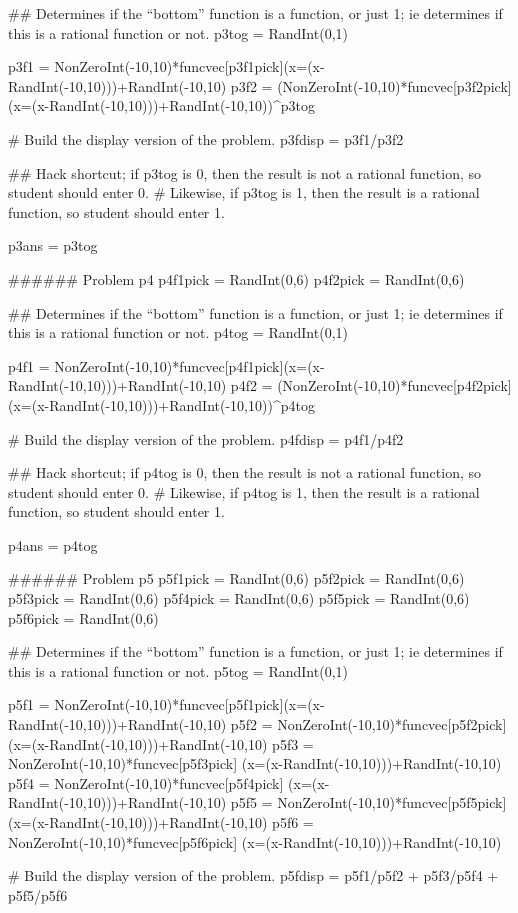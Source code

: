 \documentclass{ximera}
\begin{document}
\begin{sagesilent}
## Determines if the ``bottom'' function is a function, or just 1; ie determines if this is a rational function or not.
p3tog = RandInt(0,1)

p3f1 = NonZeroInt(-10,10)*funcvec[p3f1pick](x=(x-RandInt(-10,10)))+RandInt(-10,10)
p3f2 = (NonZeroInt(-10,10)*funcvec[p3f2pick](x=(x-RandInt(-10,10)))+RandInt(-10,10))^p3tog

# Build the display version of the problem.
p3fdisp = p3f1/p3f2

## Hack shortcut; if p3tog is 0, then the result is not a rational function, so student should enter 0.
#   Likewise, if p3tog is 1, then the result is a rational function, so student should enter 1.

p3ans = p3tog


###### Problem p4
p4f1pick = RandInt(0,6)
p4f2pick = RandInt(0,6)

## Determines if the ``bottom'' function is a function, or just 1; ie determines if this is a rational function or not.
p4tog = RandInt(0,1)

p4f1 = NonZeroInt(-10,10)*funcvec[p4f1pick](x=(x-RandInt(-10,10)))+RandInt(-10,10)
p4f2 = (NonZeroInt(-10,10)*funcvec[p4f2pick](x=(x-RandInt(-10,10)))+RandInt(-10,10))^p4tog

# Build the display version of the problem.
p4fdisp = p4f1/p4f2

## Hack shortcut; if p4tog is 0, then the result is not a rational function, so student should enter 0.
#   Likewise, if p4tog is 1, then the result is a rational function, so student should enter 1.

p4ans = p4tog



###### Problem p5
p5f1pick = RandInt(0,6)
p5f2pick = RandInt(0,6)
p5f3pick = RandInt(0,6)
p5f4pick = RandInt(0,6)
p5f5pick = RandInt(0,6)
p5f6pick = RandInt(0,6)

## Determines if the ``bottom'' function is a function, or just 1; ie determines if this is a rational function or not.
p5tog = RandInt(0,1)

p5f1 = NonZeroInt(-10,10)*funcvec[p5f1pick](x=(x-RandInt(-10,10)))+RandInt(-10,10)
p5f2 = NonZeroInt(-10,10)*funcvec[p5f2pick] (x=(x-RandInt(-10,10)))+RandInt(-10,10)
p5f3 = NonZeroInt(-10,10)*funcvec[p5f3pick] (x=(x-RandInt(-10,10)))+RandInt(-10,10)
p5f4 = NonZeroInt(-10,10)*funcvec[p5f4pick] (x=(x-RandInt(-10,10)))+RandInt(-10,10)
p5f5 = NonZeroInt(-10,10)*funcvec[p5f5pick] (x=(x-RandInt(-10,10)))+RandInt(-10,10)
p5f6 = NonZeroInt(-10,10)*funcvec[p5f6pick] (x=(x-RandInt(-10,10)))+RandInt(-10,10)



# Build the display version of the problem.
p5fdisp = p5f1/p5f2 + p5f3/p5f4 + p5f5/p5f6




\end{sagesilent}
\end{document}
